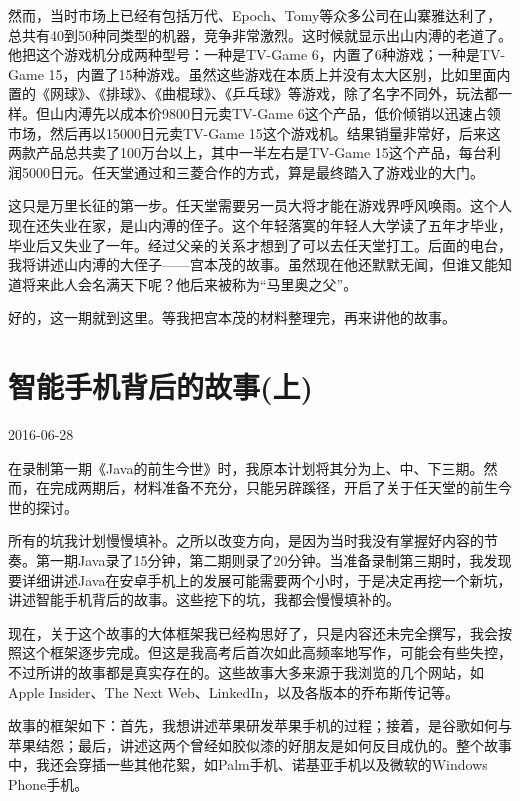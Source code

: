 \documentclass[
  letterpaper,
  DIV=11,
  numbers=noendperiod]{scrreprt}
\begin{document}
然而，当时市场上已经有包括万代、Epoch、Tomy等众多公司在山寨雅达利了，总共有40到50种同类型的机器，竞争非常激烈。这时候就显示出山内溥的老道了。他把这个游戏机分成两种型号：一种是TV-Game
6，内置了6种游戏；一种是TV-Game
15，内置了15种游戏。虽然这些游戏在本质上并没有太大区别，比如里面内置的《网球》、《排球》、《曲棍球》、《乒乓球》等游戏，除了名字不同外，玩法都一样。但山内溥先以成本价9800日元卖TV-Game
6这个产品，低价倾销以迅速占领市场，然后再以15000日元卖TV-Game
15这个游戏机。结果销量非常好，后来这两款产品总共卖了100万台以上，其中一半左右是TV-Game
15这个产品，每台利润5000日元。任天堂通过和三菱合作的方式，算是最终踏入了游戏业的大门。

这只是万里长征的第一步。任天堂需要另一员大将才能在游戏界呼风唤雨。这个人现在还失业在家，是山内溥的侄子。这个年轻落寞的年轻人大学读了五年才毕业，毕业后又失业了一年。经过父亲的关系才想到了可以去任天堂打工。后面的电台，我将讲述山内溥的大侄子------宫本茂的故事。虽然现在他还默默无闻，但谁又能知道将来此人会名满天下呢？他后来被称为``马里奥之父''。

好的，这一期就到这里。等我把宫本茂的材料整理完，再来讲他的故事。


\chapter{智能手机背后的故事(上)}\label{ux667aux80fdux624bux673aux80ccux540eux7684ux6545ux4e8bux4e0a}

2016-06-28

在录制第一期《Java的前生今世》时，我原本计划将其分为上、中、下三期。然而，在完成两期后，材料准备不充分，只能另辟蹊径，开启了关于任天堂的前生今世的探讨。

所有的坑我计划慢慢填补。之所以改变方向，是因为当时我没有掌握好内容的节奏。第一期Java录了15分钟，第二期则录了20分钟。当准备录制第三期时，我发现要详细讲述Java在安卓手机上的发展可能需要两个小时，于是决定再挖一个新坑，讲述智能手机背后的故事。这些挖下的坑，我都会慢慢填补的。

现在，关于这个故事的大体框架我已经构思好了，只是内容还未完全撰写，我会按照这个框架逐步完成。但这是我高考后首次如此高频率地写作，可能会有些失控，不过所讲的故事都是真实存在的。这些故事大多来源于我浏览的几个网站，如Apple
Insider、The Next Web、LinkedIn，以及各版本的乔布斯传记等。

故事的框架如下：首先，我想讲述苹果研发苹果手机的过程；接着，是谷歌如何与苹果结怨；最后，讲述这两个曾经如胶似漆的好朋友是如何反目成仇的。整个故事中，我还会穿插一些其他花絮，如Palm手机、诺基亚手机以及微软的Windows
Phone手机。
\end{document}
